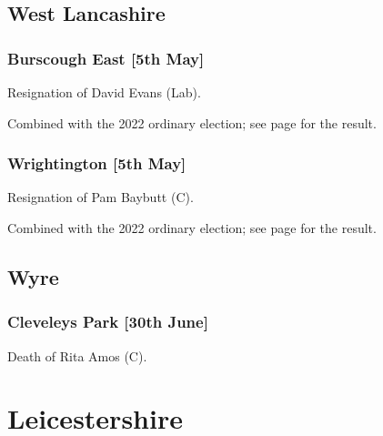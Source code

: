 \documentclass[a4paper,openany]{book}
\begin{document}
\begin{resultsiii}
\subsection*{West Lancashire}

\subsubsection*{Burscough East \hspace*{\fill}\nolinebreak[1]%
	\enspace\hspace*{\fill}
	[5th May]}


Resignation of David Evans (Lab).

Combined with the 2022 ordinary election; see page \pageref{WestLancsBurscoughEast} for the result.

\subsubsection*{Wrightington \hspace*{\fill}\nolinebreak[1]%
	\enspace\hspace*{\fill}
	[5th May]}


Resignation of Pam Baybutt (C).

Combined with the 2022 ordinary election; see page \pageref{WestLancsWrightington} for the result.

\subsection*{Wyre}

\subsubsection*{Cleveleys Park \hspace*{\fill}\nolinebreak[1]%
	\enspace\hspace*{\fill}
	[30th June]}


Death of Rita Amos (C).

\section{Leicestershire}


\end{resultsiii}
\end{document}
